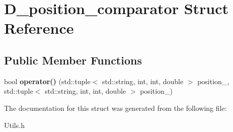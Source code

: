\hypertarget{structD__position__comparator}{}\section{D\+\_\+position\+\_\+comparator Struct Reference}
\label{structD__position__comparator}
\subsection*{Public Member Functions}
\begin{DoxyCompactItemize}
\item 
\mbox{\label{structD__position__comparator_a5b97cf8744cccb01ae25947ceacfb5f5}} 
bool {\bfseries operator()} (std\+::tuple$<$ std\+::string, int, int, double $>$ position\+\_, std\+::tuple$<$ std\+::string, int, int, double $>$ position\+\_)
\end{DoxyCompactItemize}


The documentation for this struct was generated from the following file\+:\begin{DoxyCompactItemize}
\item 
Utils.\+h\end{DoxyCompactItemize}
